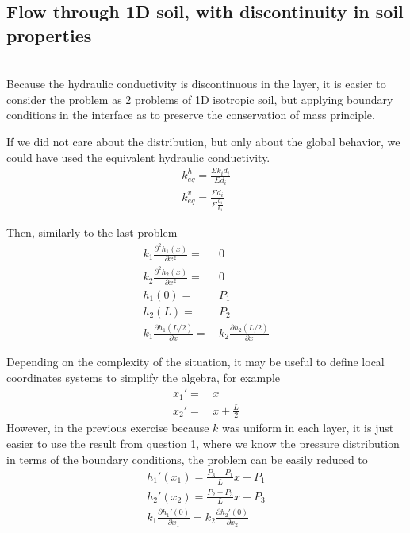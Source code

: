 \documentclass[a4paper, 11pt,article,oneside]{memoir}%
\begin{document}
\subsection{Flow through 1D soil, with discontinuity in soil properties}\\
Because the hydraulic conductivity is discontinuous in the layer, it is easier to consider the problem as 2 problems of 1D isotropic soil, but applying boundary conditions in the interface as to preserve the conservation of mass principle.
\begin{note}
If we did not care about the distribution, but only about the global behavior, we could have used the equivalent hydraulic conductivity.
\begin{gather*}
k_{eq}^h=\frac{\Sigma k_id_i}{\Sigma d_i}\\
k_{eq}^v=\frac{\Sigma d_i}{\Sigma \frac{d_i}{k_i}}\
\end{gather*}
\end{note}
Then, similarly to the last problem 
\begin{align*}
k_1\frac{\partial^2 h_1(x)}{\partial x^2}=&\,0 \\
k_2\frac{\partial^2 h_2(x)}{\partial x^2}=&\,0 \\
h_1(0)=&\,P_1\\
h_2(L)=&\,P_2 \\
k_1\frac{\partial h_1(L/2)}{\partial x}=&\,k_2\frac{\partial h_2(L/2)}{\partial x}
\end{align*}
\begin{note}
Depending on the complexity of the situation, it may be useful to define local coordinates systems to simplify the algebra, for example
\begin{align*}
x_1'=&\,x\\
x_2'=&\,x+\frac{L}{2}
\end{align*}
However, in the previous exercise because $k$ was uniform in each layer, it is just easier to use the result from question 1, where we know the pressure distribution in terms of  the boundary conditions, the problem can be easily reduced to 
\begin{align*}
h_1'(x_1)=\frac{P_3-P_1}{L}x+P_1\\
h_2'(x_2)=\frac{P_2-P_3}{L}x+P_3\\
k_1\frac{\partial h_1'(0)}{\partial x_1}=k_2\frac{\partial h_2'(0)}{\partial x_2}
\end{align*}
\end{note}
\end{document}
